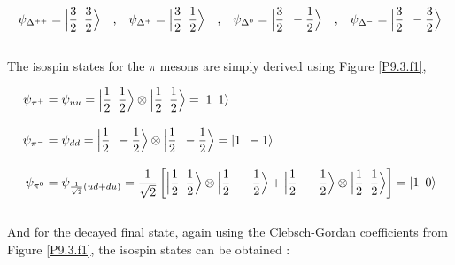 \begin{solution}
\begin{align*}
    \psi_{\Delta^{++}} =  \Big| \frac{3}{2} \hskip0.5em\relax \frac{3}{2} \Big\rangle \quad \text{,} \quad \psi_{\Delta^{+}} =  \Big| \frac{3}{2} \hskip0.5em\relax \frac{1}{2} \Big\rangle \quad \text{,} \quad \psi_{\Delta^{0}} =  \Big| \frac{3}{2} \hskip0.5em\relax -\frac{1}{2} \Big\rangle \quad \text{,} \quad \psi_{\Delta^{-}} =  \Big| \frac{3}{2} \hskip0.5em\relax -\frac{3}{2} \Big\rangle 
\end{align*}\\
The isospin states for the $\pi$ mesons are simply derived using Figure \ref{P9.3.f1},

\begin{align*}
    \psi_{\pi^+} &= \psi_{uu} =  \Big| \frac{1}{2} \hskip0.5em\relax \frac{1}{2} \Big\rangle \otimes  \Big| \frac{1}{2} \hskip0.5em\relax \frac{1}{2} \Big\rangle = \ket{1\hskip0.5em\relax 1} \\[0.12in]
    \psi_{\pi^-} &= \psi_{dd} =  \Big| \frac{1}{2} \hskip0.5em\relax -\frac{1}{2} \Big\rangle \otimes  \Big| \frac{1}{2} \hskip0.5em\relax -\frac{1}{2} \Big\rangle = \ket{1\hskip0.5em\relax -1} \\[0.12in]
    \psi_{\pi^0} &= \psi_{\frac{1}{\sqrt{2}}\left( ud+du \right)} =  \frac{1}{\sqrt{2}}\left[ \Big| \frac{1}{2} \hskip0.5em\relax \frac{1}{2} \Big\rangle \otimes  \Big| \frac{1}{2} \hskip0.5em\relax -\frac{1}{2} \Big\rangle +   \Big| \frac{1}{2} \hskip0.5em\relax- \frac{1}{2} \Big\rangle \otimes  \Big| \frac{1}{2} \hskip0.5em\relax  \frac{1}{2} \Big\rangle  \right]= \ket{1\hskip0.5em\relax 0} 
\end{align*}\\
And for the decayed final state, again using the Clebsch-Gordan coefficients from Figure \ref{P9.3.f1}, the isospin states can be obtained :


\end{solution}
